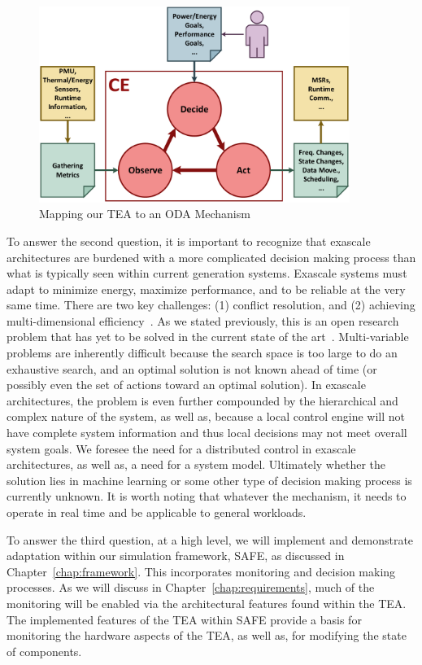     \begin{figure}[htb!]
        \centering
        \includegraphics[width=0.9\textwidth]{Fig/ODA_loop_TG.pdf}
        \caption[Mapping our TEA to an ODA Mechanism]{Mapping our TEA to an ODA Mechanism}
        \label{fig:ODA-TEA}
    \end{figure}

   To answer the second question, it is important to recognize that exascale architectures are burdened with a more complicated decision making process than what is typically seen within current generation systems. Exascale systems must adapt to minimize energy, maximize performance, and to be reliable at the very same time. There are two key challenges: (1) conflict resolution, and (2) achieving multi-dimensional efficiency~\cite{Hoffman2013}. As we stated previously, this is an open research problem that has yet to be solved in the current state of the art~\cite{SalehieEtAl2009}. Multi-variable problems are inherently difficult because the search space is too large to do an exhaustive search, and an optimal solution is not known ahead of time (or possibly even the set of actions toward an optimal solution). In exascale architectures, the problem is even further compounded by the hierarchical and complex nature of the system, as well as, because a local control engine will not have complete system information and thus local decisions may not meet overall system goals. We foresee the need for a distributed control in exascale architectures, as well as, a need for a system model. Ultimately whether the solution lies in machine learning or some other type of decision making process is currently unknown. It is worth noting that whatever the mechanism, it needs to operate in real time and be applicable to general workloads.

   To answer the third question, at a high level, we will implement and demonstrate adaptation within our simulation framework, SAFE, as discussed in Chapter~\ref{chap:framework}. This incorporates monitoring and decision making processes. As we will discuss in Chapter~\ref{chap:requirements}, much of the monitoring will be enabled via the architectural features found within the TEA. The implemented features of the TEA within SAFE provide a basis for monitoring the hardware aspects of the TEA, as well as, for modifying the state of components.
